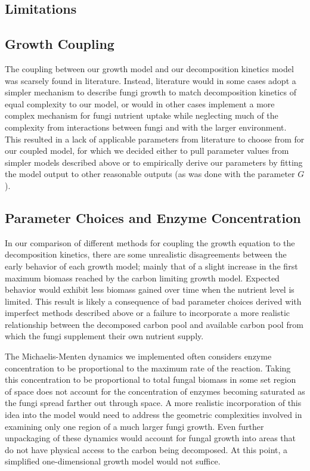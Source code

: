 \documentclass[12pt]{article}
\begin{document}
\begin{multicols}{2}
\section{Limitations}
\subsection{Growth Coupling}
The coupling between our growth model and our decomposition kinetics model was scarsely found in literature. Instead, literature would in some cases adopt a simpler mechanism to describe fungi growth to match decomposition kinetics of equal complexity to our model, or would in other cases implement a more complex mechanism for fungi nutrient uptake while neglecting much of the complexity from interactions between fungi and with the larger environment. This resulted in a lack of applicable parameters from literature to choose from for our coupled model, for which we decided either to pull parameter values from simpler models described above or to empirically derive our parameters by fitting the model output to other reasonable outputs (as was done with the parameter $G$). 

\subsection{Parameter Choices and Enzyme Concentration}
In our comparison of different methods for coupling the growth equation to the decomposition kinetics, there are some unrealistic disagreements between the early behavior of each growth model; mainly that of a slight increase in the first maximum biomass reached by the carbon limiting growth model. Expected behavior would exhibit less biomass gained over time when the nutrient level is limited. This result is likely a consequence of bad parameter choices derived with imperfect methods described above or a failure to incorporate a more realistic relationship between the decomposed carbon pool and available carbon pool from which the fungi supplement their own nutrient supply.

The Michaelis-Menten dynamics we implemented often considers enzyme concentration to be proportional to the maximum rate of the reaction. Taking this concentration to be proportional to total fungal biomass in some set region of space does not account for the concentration of enzymes becoming saturated as the fungi spread farther out through space. A more realistic incorporation of this idea into the model would need to address the geometric complexities involved in examining only one region of a much larger fungi growth. Even further unpackaging of these dynamics would account for fungal growth into areas that do not have physical access to the carbon being decomposed. At this point, a simplified one-dimensional growth model would not suffice.


\end{multicols}
\end{document}
